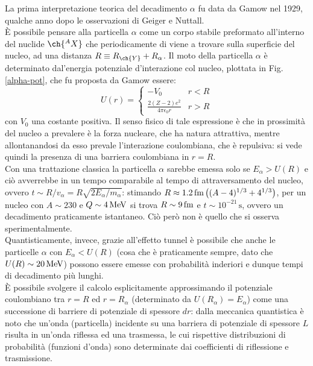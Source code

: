 La prima interpretazione teorica del decadimento $ \alpha $ fu data da Gamow nel 1929, qualche anno dopo le osservazioni di Geiger e Nuttall.\\
È possibile pensare alla particella $ \alpha $ come un corpo stabile preformato all'interno del nuclide $ \ch{^A X} $ che periodicamente di viene a trovare sulla superficie del nucleo, ad una distanza $ R \equiv R_{\ch{Y}} + R_{\alpha} $. Il moto della particella $ \alpha $ è determinato dal'energia potenziale d'interazione col nucleo, plottata in Fig. \ref{alpha-pot}, che fu proposta da Gamow essere:
\begin{equation}
	U(r) =
	\begin{cases}
		-V_0 & r < R \\
		\frac{2(Z-2)e^2}{4\pi \epsilon_0 r} & r > R
	\end{cases}
	\label{eq:2.12}
\end{equation}
con $ V_0 $ una costante positiva. Il senso fisico di tale espressione è che in prossimità del nucleo a prevalere è la forza nucleare, che ha natura attrattiva, mentre allontanandosi da esso prevale l'interazione coulombiana, che è repulsiva: si vede quindi la presenza di una barriera coulombiana in $ r = R $.\\
Con una trattazione classica la particella $ \alpha $ sarebbe emessa solo se $ E_{\alpha} > U(R) $ e ciò avverrebbe in un tempo comparabile al tempo di attraversamento del nucleo, ovvero $ t \sim R / v_{\alpha} = R \sqrt{2E_{\alpha} / m_{\alpha}} $: stimando $ R \approx 1.2\,\text{fm} \left( (A - 4)^{1/3} + 4^{1/3} \right) $, per un nucleo con $ A \sim 230 $ e $ Q \sim 4\,\text{MeV} $ si trova $ R \sim 9\,\text{fm} $ e $ t \sim 10^{-21}\,\text{s} $, ovvero un decadimento praticamente istantaneo. Ciò però non è quello che si osserva sperimentalmente.\\
Quantisticamente, invece, grazie all'effetto tunnel è possibile che anche le particelle $ \alpha $ con $ E_{\alpha} < U(R) $ (cosa che è praticamente sempre, dato che $ U(R) \sim 20\,\text{MeV} $) possono essere emesse con probabilità inderiori e dunque tempi di decadimento più lunghi.\\
È possibile svolgere il calcolo esplicitamente approssimando il potenziale coulombiano tra $ r = R $ ed $ r = R_{\alpha} $ (determinato da $ U(R_{\alpha}) = E_{\alpha} $) come una successione di barriere di potenziale di spessore $ dr $: dalla meccanica quantistica è noto che un'onda (particella) incidente su una barriera di potenziale di spessore $ L $ risulta in un'onda riflessa ed una trasmessa, le cui rispettive distribuzioni di probabilità (funzioni d'onda) sono determinate dai coefficienti di riflessione e trasmissione.


